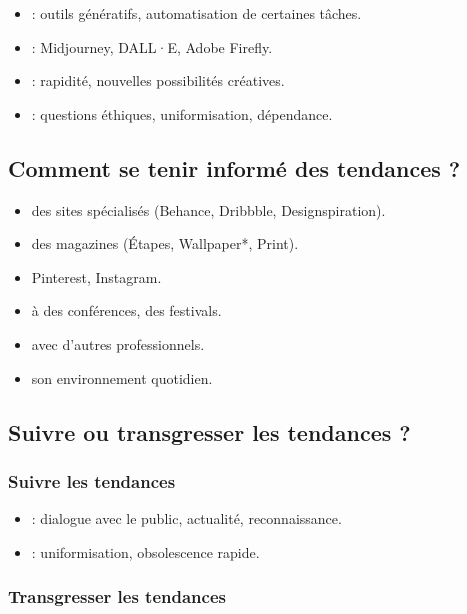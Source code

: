 \begin{itemize}
    \item {} : outils génératifs, automatisation de certaines tâches.
    \item {} : Midjourney, DALL·E, Adobe Firefly.
    \item {} : rapidité, nouvelles possibilités créatives.
    \item {} : questions éthiques, uniformisation, dépendance.
\end{itemize}

\subsection{Comment se tenir informé des tendances ?}

\begin{itemize}
    \item {} des sites spécialisés (Behance, Dribbble, Designspiration).
    \item {} des magazines (Étapes, Wallpaper*, Print).
    \item {} Pinterest, Instagram.
    \item {} à des conférences, des festivals.
    \item {} avec d'autres professionnels.
    \item {} son environnement quotidien.
\end{itemize}

\subsection{Suivre ou transgresser les tendances ?}

\subsubsection{Suivre les tendances}

\begin{itemize}
    \item {} : dialogue avec le public, actualité, reconnaissance.
    \item {} : uniformisation, obsolescence rapide.
\end{itemize}

\subsubsection{Transgresser les tendances}

